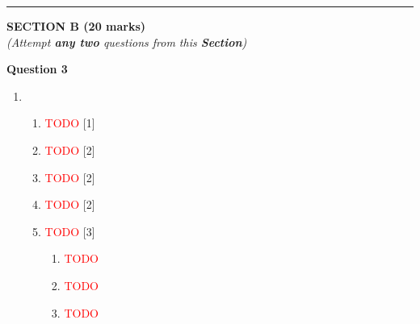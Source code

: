 \par\noindent\rule{\textwidth}{0.4pt}
\begin{center}
   \large
   \textbf{SECTION B (20 marks)}\\
   \vspace{5mm}
   \normalsize
   \textit{(Attempt \textbf{any two} questions from this \textbf{Section})}
\end{center}
\par

\noindent
\textbf{Question 3}
\begin{enumerate}[label=(\roman*)]

    \item 
        \begin{enumerate}[label=(\alph*)]
            \item \textcolor{red}{TODO} \hfill[1]
            \item \textcolor{red}{TODO} \hfill[2]
            \item \textcolor{red}{TODO} \hfill[2]
            \item \textcolor{red}{TODO} \hfill[2]
            \item \textcolor{red}{TODO} \hfill[3]
                \begin{enumerate}[label=(\roman*)]
                \item \textcolor{red}{TODO}
                \item \textcolor{red}{TODO}
                \item \textcolor{red}{TODO}
                \end{enumerate}
        \end{enumerate}

\end{enumerate}


